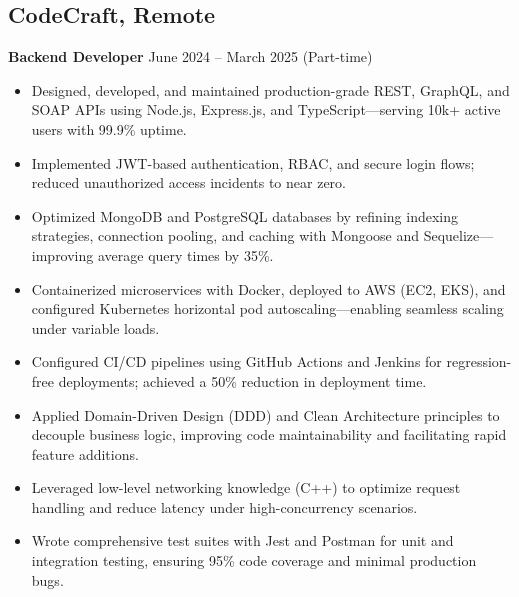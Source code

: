 \documentclass[11pt]{article}
\begin{document}
\subsection*{CodeCraft, Remote}
\textbf{Backend Developer} \hfill June 2024 -- March 2025 (Part-time)\\
\begin{itemize}[leftmargin=*]\itemsep0pt
  \item Designed, developed, and maintained production-grade REST, GraphQL, and SOAP APIs using Node.js, Express.js, and TypeScript—serving 10k+ active users with 99.9\% uptime.
  \item Implemented JWT-based authentication, RBAC, and secure login flows; reduced unauthorized access incidents to near zero.
  \item Optimized MongoDB and PostgreSQL databases by refining indexing strategies, connection pooling, and caching with Mongoose and Sequelize—improving average query times by 35\%.
  \item Containerized microservices with Docker, deployed to AWS (EC2, EKS), and configured Kubernetes horizontal pod autoscaling—enabling seamless scaling under variable loads.
  \item Configured CI/CD pipelines using GitHub Actions and Jenkins for regression-free deployments; achieved a 50\% reduction in deployment time.
  \item Applied Domain-Driven Design (DDD) and Clean Architecture principles to decouple business logic, improving code maintainability and facilitating rapid feature additions.
  \item Leveraged low-level networking knowledge (C++) to optimize request handling and reduce latency under high-concurrency scenarios.
  \item Wrote comprehensive test suites with Jest and Postman for unit and integration testing, ensuring 95\% code coverage and minimal production bugs.
\end{itemize}

\vspace{0.2cm}
\end{document}
